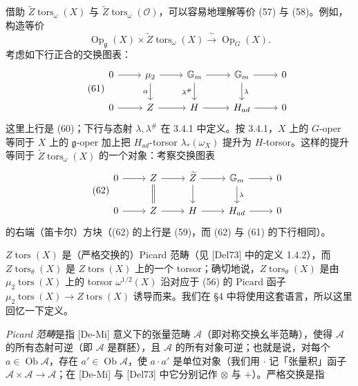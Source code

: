 借助 $\widetilde{Z}\operatorname{tors}_{\omega}(X)$ 与 $\widetilde{Z}\operatorname{tors}_{\omega}(\mathcal{O})$，可以容易地理解等价 (57) 与 (58)。例如，构造等价
\[
  \operatorname{Op}_{\mathfrak{g}}(X)\times\widetilde{Z}\operatorname{tors}_{\omega}(X)\xrightarrow{\ \sim\ }\operatorname{Op}_{G}(X).
\]
考虑如下行正合的交换图表：
\begin{equation}\tag{61}
  \begin{tikzcd}
    0\arrow[r] & \mu_{2}\arrow[r]\arrow[d, "\alpha"'] & \mathbb{G}_{m}\arrow[r]\arrow[d, "\lambda^{\#}"'] & \mathbb{G}_{m}\arrow[r]\arrow[d, "\lambda"] & 0\\
    0\arrow[r] & Z\arrow[r] & H\arrow[r] & H_{ad}\arrow[r] & 0
  \end{tikzcd}
\end{equation}
这里上行是 (60)；下行与态射 $\lambda,\lambda^{\#}$ 在 3.4.1 中定义。按 3.4.1，$X$ 上的 $G$-oper 等同于 $X$ 上的 $\mathfrak{g}$-oper 加上把 $H_{ad}$-torsor $\lambda_{*}(\omega_{X})$ 提升为 $H$-torsor。这样的提升等同于 $\widetilde{Z}\operatorname{tors}_{\omega}(X)$ 的一个对象：考察交换图表
\begin{equation}\tag{62}
  \begin{tikzcd}
    0\arrow[r] & Z\arrow[r]\arrow[d, equal] & \widetilde{Z}\arrow[r]\arrow[d] & \mathbb{G}_{m}\arrow[r]\arrow[d, "\lambda"] & 0\\
    0\arrow[r] & Z\arrow[r] & H\arrow[r] & H_{ad}\arrow[r] & 0
  \end{tikzcd}
\end{equation}
的右端（笛卡尔）方块（(62) 的上行是 (59)，而 (62) 与 (61) 的下行相同）。

 $Z\operatorname{tors}(X)$ 是（严格交换的）Picard 范畴（见 [Del73] 中的定义 1.4.2），而 $Z\operatorname{tors}_{\theta}(X)$ 是 $Z\operatorname{tors}(X)$ 上的一个 torsor；确切地说，$Z\operatorname{tors}_{\theta}(X)$ 是由 $\mu_{2}\operatorname{tors}(X)$ 上的 torsor $\omega^{1/2}(X)$ 沿对应于 (56) 的 Picard 函子 $\mu_{2}\operatorname{tors}(X)\to Z\operatorname{tors}(X)$ 诱导而来。我们在 §4 中将使用这套语言，所以这里回忆一下定义。

\emph{Picard 范畴}是指 [De-Mi] 意义下的张量范畴 $\mathcal{A}$（即对称交换幺半范畴），使得 $\mathcal{A}$ 的所有态射可逆（即 $\mathcal{A}$ 是群胚），且 $\mathcal{A}$ 的所有对象可逆；也就是说，对每个 $a\in\operatorname{Ob}\mathcal{A}$，存在 $a'\in\operatorname{Ob}\mathcal{A}$，使 $a\cdot a'$ 是单位对象（我们用 $\cdot$ 记「张量积」函子 $\mathcal{A}\times\mathcal{A}\to\mathcal{A}$；在 [De-Mi] 与 [Del73] 中它分别记作 $\otimes$ 与 $+$）。严格交换是指

